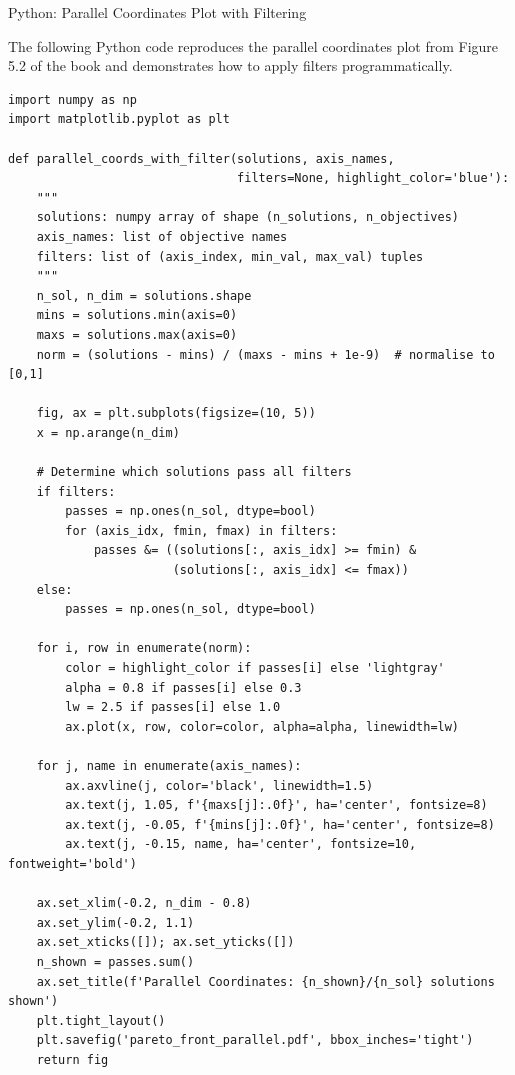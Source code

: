 \documentclass[aspectratio=169,10pt]{beamer}
\begin{document}
\begin{frame}[fragile]{Python: Parallel Coordinates Plot with Filtering}

  The following Python code reproduces the parallel coordinates plot from
  Figure 5.2 of the book and demonstrates how to apply filters programmatically.

\begin{lstlisting}[caption={Parallel Coordinates with Filters (Python/matplotlib)}]
import numpy as np
import matplotlib.pyplot as plt

def parallel_coords_with_filter(solutions, axis_names,
                                filters=None, highlight_color='blue'):
    """
    solutions: numpy array of shape (n_solutions, n_objectives)
    axis_names: list of objective names
    filters: list of (axis_index, min_val, max_val) tuples
    """
    n_sol, n_dim = solutions.shape
    mins = solutions.min(axis=0)
    maxs = solutions.max(axis=0)
    norm = (solutions - mins) / (maxs - mins + 1e-9)  # normalise to [0,1]

    fig, ax = plt.subplots(figsize=(10, 5))
    x = np.arange(n_dim)

    # Determine which solutions pass all filters
    if filters:
        passes = np.ones(n_sol, dtype=bool)
        for (axis_idx, fmin, fmax) in filters:
            passes &= ((solutions[:, axis_idx] >= fmin) &
                       (solutions[:, axis_idx] <= fmax))
    else:
        passes = np.ones(n_sol, dtype=bool)

    for i, row in enumerate(norm):
        color = highlight_color if passes[i] else 'lightgray'
        alpha = 0.8 if passes[i] else 0.3
        lw = 2.5 if passes[i] else 1.0
        ax.plot(x, row, color=color, alpha=alpha, linewidth=lw)

    for j, name in enumerate(axis_names):
        ax.axvline(j, color='black', linewidth=1.5)
        ax.text(j, 1.05, f'{maxs[j]:.0f}', ha='center', fontsize=8)
        ax.text(j, -0.05, f'{mins[j]:.0f}', ha='center', fontsize=8)
        ax.text(j, -0.15, name, ha='center', fontsize=10, fontweight='bold')

    ax.set_xlim(-0.2, n_dim - 0.8)
    ax.set_ylim(-0.2, 1.1)
    ax.set_xticks([]); ax.set_yticks([])
    n_shown = passes.sum()
    ax.set_title(f'Parallel Coordinates: {n_shown}/{n_sol} solutions shown')
    plt.tight_layout()
    plt.savefig('pareto_front_parallel.pdf', bbox_inches='tight')
    return fig


\end{lstlisting}
\end{frame}
\end{document}
